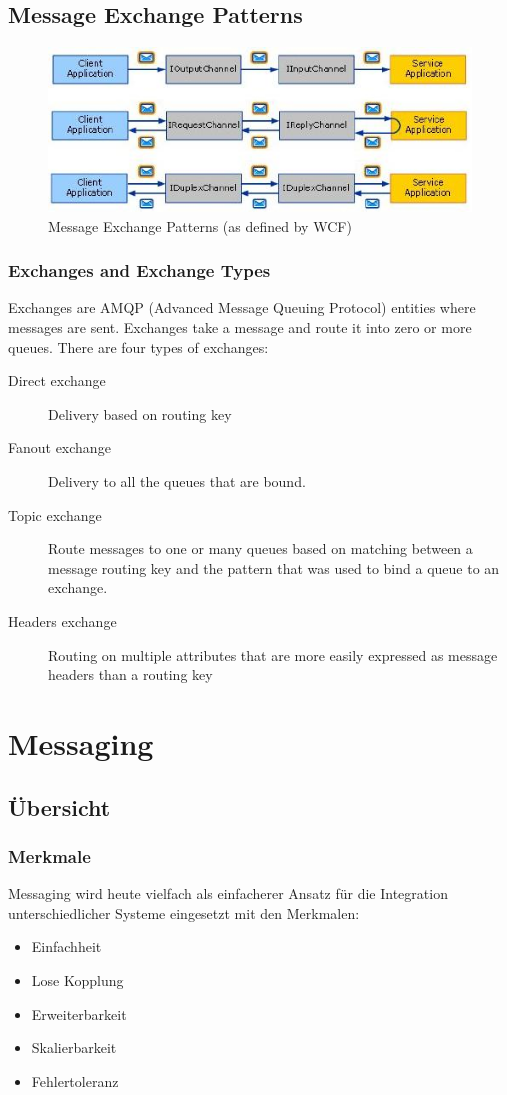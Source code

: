 \subsection{Message Exchange Patterns}

\begin{figure}[h]
	\centering
	\includegraphics[width=0.7\linewidth]{img/pattern_wcf}
	\caption{Message Exchange Patterns (as defined by WCF)}
	\label{fig:patternwcf}
\end{figure}

\subsubsection{Exchanges and Exchange Types}
Exchanges are AMQP (Advanced Message Queuing Protocol) entities where messages are sent. Exchanges take a message and route it into zero or more queues. There are four types of exchanges:
\begin{description}
	\item[Direct exchange] Delivery based on routing key
	\item[Fanout exchange] Delivery to all the queues that are bound.
	\item[Topic exchange] Route messages to one or many queues based on matching between a message routing key and the pattern that was used to bind a queue to an exchange.
	\item[Headers exchange] Routing on multiple attributes that are more easily expressed as message headers than a routing key
\end{description}

\section{Messaging}
\subsection{Übersicht}
\subsubsection{Merkmale}
Messaging wird heute vielfach als einfacherer Ansatz für die Integration unterschiedlicher Systeme eingesetzt mit den Merkmalen:
\begin{itemize}
	\item Einfachheit
	\item Lose Kopplung
	\item Erweiterbarkeit
	\item Skalierbarkeit
	\item Fehlertoleranz
\end{itemize}

